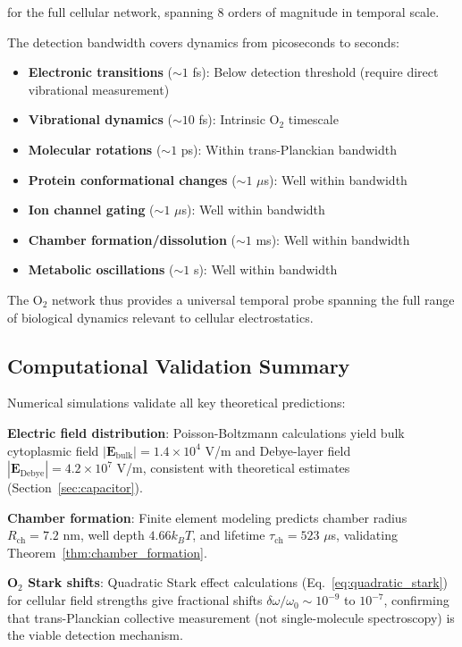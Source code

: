 \documentclass[twocolumn,10pt,aps,prd,superscriptaddress,floatfix,nofootinbib]{revtex4-2}
\theoremstyle{remark}
\begin{document}
for the full cellular network, spanning 8 orders of magnitude in temporal scale.

The detection bandwidth covers dynamics from picoseconds to seconds:
\begin{itemize}
\item \textbf{Electronic transitions} ($\sim 1$ fs): Below detection threshold (require direct vibrational measurement)
\item \textbf{Vibrational dynamics} ($\sim 10$ fs): Intrinsic O$_2$ timescale
\item \textbf{Molecular rotations} ($\sim 1$ ps): Within trans-Planckian bandwidth
\item \textbf{Protein conformational changes} ($\sim 1$ $\mu$s): Well within bandwidth
\item \textbf{Ion channel gating} ($\sim 1$ $\mu$s): Well within bandwidth
\item \textbf{Chamber formation/dissolution} ($\sim 1$ ms): Well within bandwidth
\item \textbf{Metabolic oscillations} ($\sim 1$ s): Well within bandwidth
\end{itemize}

The O$_2$ network thus provides a universal temporal probe spanning the full range of biological dynamics relevant to cellular electrostatics.

\subsection{Computational Validation Summary}

Numerical simulations validate all key theoretical predictions:

\textbf{Electric field distribution}: Poisson-Boltzmann calculations yield bulk cytoplasmic field $|\mathbf{E}_{\mathrm{bulk}}| = 1.4 \times 10^4$ V/m and Debye-layer field $|\mathbf{E}_{\mathrm{Debye}}| = 4.2 \times 10^7$ V/m, consistent with theoretical estimates (Section~\ref{sec:capacitor}).

\textbf{Chamber formation}: Finite element modeling predicts chamber radius $R_{\mathrm{ch}} = 7.2$ nm, well depth $4.66 k_B T$, and lifetime $\tau_{\mathrm{ch}} = 523$ $\mu$s, validating Theorem~\ref{thm:chamber_formation}.

\textbf{O$_2$ Stark shifts}: Quadratic Stark effect calculations (Eq.~\ref{eq:quadratic_stark}) for cellular field strengths give fractional shifts $\delta\omega/\omega_0 \sim 10^{-9}$ to $10^{-7}$, confirming that trans-Planckian collective measurement (not single-molecule spectroscopy) is the viable detection mechanism.
\end{document}
